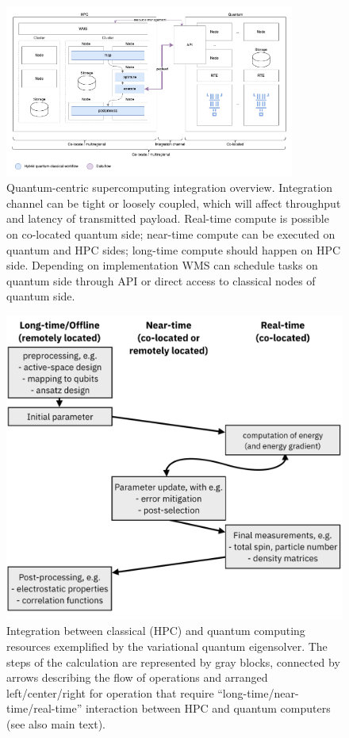 \begin{figure}
    \centering
     \includegraphics[width=0.85\textwidth]{groups/4._Queueing/images/hpc-quantum-integration.png}
    \caption{Quantum-centric supercomputing integration overview. Integration channel can be tight or loosely coupled, which will affect throughput and latency of transmitted payload. Real-time compute is possible on co-located quantum side; near-time compute can be executed on quantum and HPC sides; long-time compute should happen on HPC side. Depending on implementation WMS can schedule tasks on quantum side through API or direct access to classical nodes of quantum side.}

    
    \label{figure:HPCQuantumIntegration}
\end{figure}

\begin{figure}
    \centering
     \includegraphics[width=\columnwidth]{groups/4._Queueing/images/example_integration.png}
    \caption{Integration between classical (HPC) and quantum computing resources exemplified by the variational quantum eigensolver. The steps of the calculation are represented by gray blocks, connected by arrows describing the flow of operations and arranged left/center/right for operation that require ``long-time/near-time/real-time'' interaction between HPC and quantum computers (see also main text). 
    }
    \label{figure:HPCQuantumIntegrationExample}
\end{figure}



